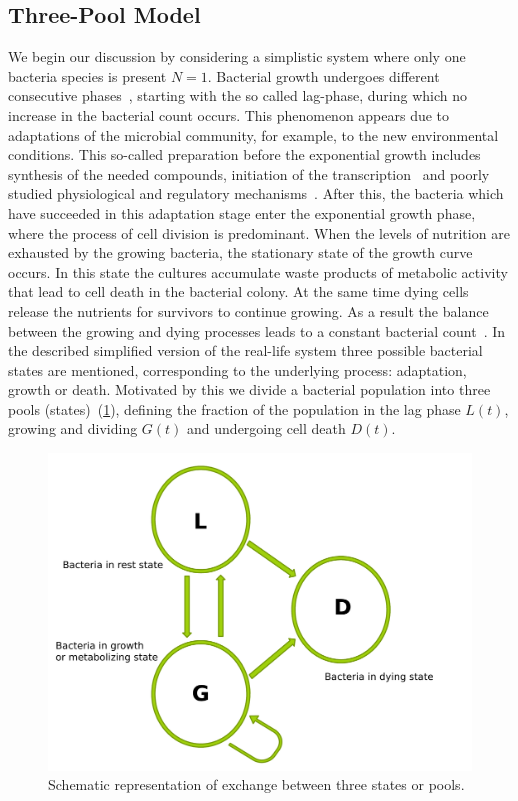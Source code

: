 \documentclass[10pt,twocolumn,5p]{elsarticle}
\numberwithin{equation}{section}
\begin{document}
\subsection{Three-Pool Model}
We begin our discussion by considering a simplistic system where only one bacteria species is present $N=1$.
Bacterial growth undergoes different consecutive phases~\cite{buchanan_when_1997}, starting with the so called lag-phase, during which no increase in the bacterial count occurs.
This phenomenon appears due to adaptations of the microbial community, for example, to the new environmental conditions.
This so-called preparation before the exponential growth includes synthesis of the needed compounds, initiation of the transcription~\cite{rolfe_lag_2012} and poorly studied physiological and regulatory mechanisms~\cite{monod_growth_1949}.
After this, the bacteria which have succeeded in this adaptation stage enter the exponential growth phase, where the process of cell division is predominant.
When the levels of nutrition are exhausted by the growing bacteria, the stationary state of the growth curve occurs.
In this state the cultures accumulate waste products of metabolic activity that lead to cell death in the bacterial colony.
At the same time dying cells release the nutrients for survivors to continue growing.
As a result the balance between the growing and dying processes leads to a constant bacterial count~\cite{navarro_llorens_stationary_2010}.
In the described simplified version of the real-life system three possible bacterial states are mentioned, corresponding to the underlying process: adaptation, growth or death.
Motivated by this we divide a bacterial population into three pools (states)~(\ref{fig:SchematicRep}), defining the fraction of the population in the lag phase $L(t)$, growing and dividing $G(t)$ and undergoing cell death $D(t)$.
\begin{figure}[t]
    \begin{center}
    \includegraphics[width=0.9\columnwidth]{Figures/TPM_fig.pdf}
    \caption{Schematic representation of exchange between three states or pools.}
    \label{fig:SchematicRep}
    \end{center}
\end{figure}
\end{document}
